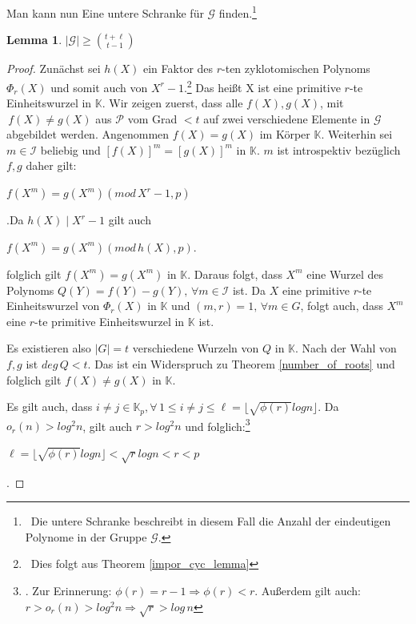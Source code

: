\documentclass[12pt,oneside]{article}
\newtheorem{lemma}[theorem]{Lemma}
\theoremstyle{remark}
\theoremstyle{definition}
\begin{document}
Man kann nun Eine untere Schranke für $\mathcal{G}$ finden.\footnote{$\,$ Die untere Schranke beschreibt in diesem Fall die Anzahl der eindeutigen Polynome in der Gruppe $\mathcal{G}$.}

\begin{lemma}\label{lemma47}
$|\mathcal{G}| \geq {t + \ell \choose t - 1}$
\end{lemma}

\begin{proof}
Zunächst sei $h(X)$ ein Faktor des $r$-ten zyklotomischen Polynoms $\Phi_r (X)$ und somit auch von $X^r - 1$.\footnote{$\,$ Dies folgt aus Theorem \ref{impor_cyc_lemma}} Das heißt X ist eine primitive $r$-te Einheitswurzel in $\mathbb{K}$. Wir zeigen zuerst, dass alle $f(X),g(X)$, mit $\, f(X) \neq g(X)$ aus $\mathcal{P}$ vom Grad $ < t$ auf zwei verschiedene Elemente in $\mathcal{G}$ abgebildet werden.\newline\newline
Angenommen $f(X) = g(X)$ im Körper $\mathbb{K}$. Weiterhin sei $m \in \mathcal{I}$ beliebig und $[f(X)]^m = [g(X)]^m$ in $\mathbb{K}$. $m$ ist introspektiv bezüglich $f, g$ daher gilt:\newline\newline
\centerline{$f(X^m) = g(X^m) (mod \, X^r - 1,p)$}.\newline\newline Da $h(X) \mid X^r - 1$ gilt auch\newline\newline
\centerline{$f(X^m) = g(X^m) (mod \, h(X),p)$.}\newline



folglich gilt $f(X^m) = g(X^m)$ in $\mathbb{K}$. Daraus folgt, dass $X^m$ eine Wurzel des Polynoms $Q(Y) = f(Y) - g(Y), \, \forall m \in \mathcal{I}$ ist. Da $X$ eine primitive $r$-te Einheitswurzel von $\Phi_r(X)$ in $\mathbb{K}$ und $(m,r) = 1, \, \forall m \in G$, folgt auch, dass $X^m$ eine $r$-te primitive Einheitswurzel in $\mathbb{K}$ ist.

Es existieren also $|G| = t$ verschiedene Wurzeln von $Q$ in $\mathbb{K}$. Nach der Wahl von $f,g$ ist $deg \, Q < t$. Das ist ein Widerspruch zu Theorem \ref{number_of_roots} und folglich gilt $f(X) \neq g(X)$ in $\mathbb{K}$.

Es gilt auch, dass $i \neq j  \in \mathbb{K}_p, \forall \, 1 \leq i \neq j \leq \ell = \lfloor \sqrt{\phi(r)} log n \rfloor$. Da $o_r(n) > log^2 n$, gilt auch $r > log^2 n$ und folglich:\footnote{. Zur Erinnerung: $\phi(r) = r - 1 \Rightarrow \phi(r) < r$. Außerdem gilt auch: $r > o_r(n) > log^2n \Rightarrow \sqrt{r} > log \, n $}\newline\newline
\centerline{$\ell = \lfloor \sqrt{\phi(r)} log n \rfloor < \sqrt{r} log  n < r < p$}.\newline


\end{proof}
\end{document}
